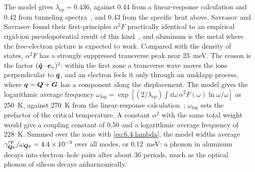 The model gives $\lambda_{\mathrm{ep}} = 0.436$, against 0.44 from a linear-response calculation and 0.42 from tunneling spectra~\cite[Table~II]{savrasov1996electron}, and 0.43 from the specific heat above. Savrasov and Savrasov found their first-principles $\alpha^2F$ practically identical to an empirical rigid-ion pseudopotential result of this kind~\cite{savrasov1996electron}, and aluminum is the metal where the free-electron picture is expected to work. Compared with the density of states, $\alpha^2F$ has a strongly suppressed transverse peak near \SI{23}{meV}. The reason is the factor $(\hat{\bm{q}}\cdot\bm{e}_\nu)^2$: within the first zone a transverse wave moves the ions perpendicular to $\bm{q}$, and an electron feels it only through an umklapp process, where $\bm{q} = \bm{Q} + \bm{G}$ has a component along the displacement. The model gives the logarithmic average frequency $\omega_{\log} = \exp[(2/\lambda_{\mathrm{ep}})\int\dd\omega\,\alpha^2F(\omega)\ln\omega/\omega]$ as \SI{250}{K}, against \SI{270}{K} from the linear-response calculation~\cite[Table~III]{savrasov1996electron}; $\omega_{\log}$ sets the prefactor of the critical temperature. A constant $\alpha^2$ with the same total weight would give a coupling constant of 0.50 and a logarithmic average frequency of \SI{228}{K}. Summed over the zone with \cref{eq:6.4-lambda}, the model widths average $\gamma^{\mathrm{ep}}_{\bm{Q}\nu}/\omega_{\bm{Q}\nu} = 4.4\times10^{-3}$ over all modes, or \SI{0.12}{meV}: a phonon in aluminum decays into electron--hole pairs after about 36 periods, much as the optical phonon of silicon decays anharmonically.

